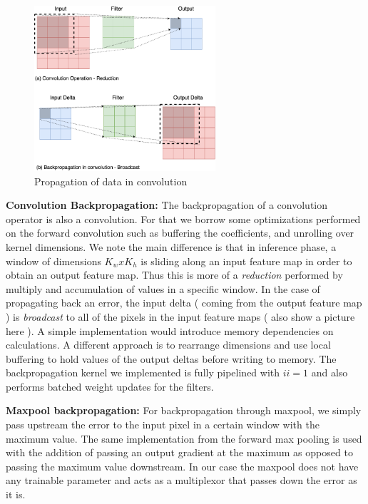 \begin{figure}[h]
\centering
\includegraphics[width=0.6\textwidth]{Figures/convprop}
\caption[Propagation of data in convolution]{ Propagation of data in convolution }
\decoRule
\label{fig:conv}
\end{figure}

\textbf{Convolution Backpropagation:} The backpropagation of a convolution operator is also a convolution. For that we borrow some optimizations performed on the forward convolution such as buffering the coefficients, and unrolling over kernel dimensions. We note the main difference is that in inference phase, a window of dimensions $ K_wxK_h $ is sliding along an input feature map in order to obtain an output feature map. Thus this is more of a \emph{reduction} performed by multiply and accumulation of values in a specific window. In the case of propagating back an error, the input delta ( coming from the output feature map ) is \emph{broadcast} to all of the pixels in the input feature maps ( also show a picture here ). A simple implementation would introduce memory dependencies on calculations. A different approach is to rearrange dimensions and use local buffering to hold values of the output deltas before writing to memory. The backpropagation kernel we implemented is fully pipelined with $ ii=1 $ and also performs batched weight updates for the filters.

\textbf{Maxpool backpropagation:} For backpropagation through maxpool, we simply pass upstream the error to the input pixel in a certain window with the maximum value. The same implementation from the forward max pooling is used with the addition of passing an output gradient at the maximum as opposed to passing the maximum value downstream. In our case the maxpool does not have any trainable parameter and acts as a multiplexor that passes down the error as it is. 


